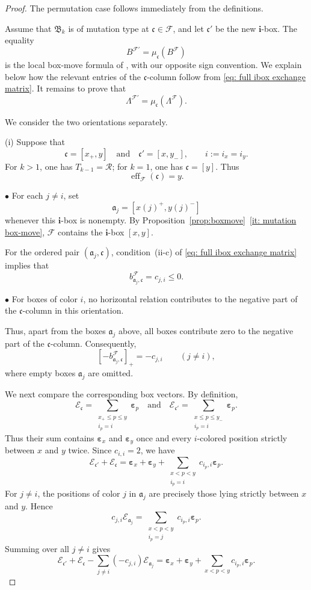 \documentclass[12pt, leqno]{amsart}
\numberwithin{equation}{section}
\theoremstyle{plain}
\theoremstyle{definition}
\renewcommand{\le}{\leqslant}
\newcommand{\seteq}{\mathbin{:=}}
\newcommand{\ve}{\boldsymbol{\varepsilon}}
\newcommand{\eff}{\operatorname{eff}}
\newcommand{\frakB}{\mathfrak{B}}
\newcommand{\fraka}{\mathfrak{a}}
\newcommand{\frakc}{\mathfrak{c}}
\newcommand{\bfi}{\mathbf{i}}
\newcommand{\calE}{\mathcal{E}}
\newcommand{\calF}{\mathcal{F}}
\newcommand{\calR}{\mathcal{R}}
\newcommand{\qtq}[1][{and}]{\quad\text{{#1}}\quad}
\begin{document}
\begin{proof}
The permutation case follows immediately from the definitions.

Assume that $\frakB_k$ is of mutation type at
$\frakc\in\calF$, and let $\frakc'$ be the new $\bfi$-box.
The equality
\[
B^{\calF'}=\mu_{\frakc}(B^\calF)
\]
is the local box-move formula of \cite{KK24}, with our opposite sign
convention. We explain below how the relevant entries of the
$\frakc$-column follow from \eqref{eq: full ibox exchange matrix}. It remains to prove that
\[
\Lambda^{\calF'}=\mu_{\frakc}(\Lambda^\calF).
\]

We consider the two orientations separately.

\smallskip

\noindent
{\rm (i)} Suppose that
\[
\frakc=[x_+,y] \qtq \frakc'=[x,y_-], \qquad i\seteq i_x=i_y.
\]
For $k>1$, one has $T_{k-1}=\calR$; for $k=1$, one has
$\frakc=[y]$. Thus
\[
\eff_{\calF}(\frakc)=y.
\]

\noindent
$\bullet$ For each $j\neq i$, set
\[
\fraka_j=[x(j)^+,y(j)^-]
\]
whenever this $\bfi$-box is nonempty. By
Proposition~\ref{prop:boxmove}~\eqref{it: mutation box-move},
$\calF$ contains the $\bfi$-box $[x,y]$.

For the ordered pair $(\fraka_j,\frakc)$, condition~{\rm (ii-c)} of
\eqref{eq: full ibox exchange matrix} implies that
\[
b^\calF_{\fraka_j,\frakc}=c_{j,i}\leq0.
\]

\noindent
$\bullet$ For boxes of color $i$, no horizontal relation contributes
to the negative part of the $\frakc$-column in this orientation.

Thus, apart from the boxes $\fraka_j$ above, all boxes contribute
zero to the negative part of the $\frakc$-column. Consequently,
\begin{equation}\label{eq: first box move negative column}
[-b^\calF_{\fraka_j,\frakc}]_+=-c_{j,i}
\qquad(j\neq i),
\end{equation}
where empty boxes $\fraka_j$ are omitted.

We next compare the corresponding box vectors. By definition,
\[
\calE_{\frakc}
=
\sum_{\substack{x_+\le p\le y\\i_p=i}}\ve_p
\qtq
\calE_{\frakc'}
=
\sum_{\substack{x\le p\le y_-\\i_p=i}}\ve_p.
\]
Thus their sum contains $\ve_x$ and $\ve_y$ once and every
$i$-colored position strictly between $x$ and $y$ twice. Since
$c_{i,i}=2$, we have
\[
\calE_{\frakc'}+\calE_{\frakc}
=
\ve_x+\ve_y
+
\sum_{\substack{x<p<y\\i_p=i}}
c_{i_p,i}\ve_p.
\]
For $j\neq i$,  the positions of color $j$ in $\fraka_j$ are precisely
those lying strictly between $x$ and $y$.{} Hence
\[
c_{j,i}\calE_{\fraka_j}
=
\sum_{\substack{x<p<y\\i_p=j}}
c_{i_p,i}\ve_p.
\]
Summing over all $j\neq i$ gives
\begin{equation}\label{eq: first box move vector identity}
\calE_{\frakc'}+\calE_{\frakc}
-
\sum_{j\neq i}(-c_{j,i})\calE_{\fraka_j}
=
\ve_x+\ve_y+\sum_{x<p<y}c_{i_p,i}\ve_p.
\end{equation}


\end{proof}
\end{document}

